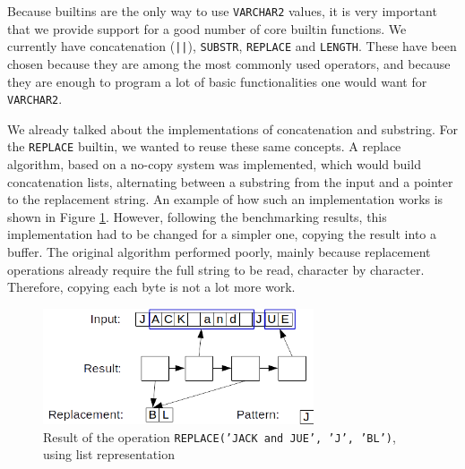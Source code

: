 \documentclass[twoside,11pt,a4paper]{article}
\newcommand{\pls}[1]{\small\texttt{#1}\normalsize}
\newcommand{\plstype}[1]{\pls{#1}}
\newcommand{\varchar}{\plstype{VARCHAR2}}
\begin{document}
Because builtins are the only way to use \varchar{} values, it is very important that we provide support for a good number of core builtin functions. We currently have concatenation (\pls{||}), \pls{SUBSTR}, \pls{REPLACE} and \pls{LENGTH}. These have been chosen because they are among the most commonly used operators, and because they are enough to program a lot of basic functionalities one would want for \varchar{}.

We already talked about the implementations of concatenation and substring. For the \pls{REPLACE} builtin, we wanted to reuse these same concepts. A replace algorithm, based on a no-copy system was implemented, which would build concatenation lists, alternating between a substring from the input and a pointer to the replacement string. An example of how such an implementation works is shown in Figure \ref{fig:replaceexample}. However, following the benchmarking results, this implementation had to be changed for a simpler one, copying the result into a buffer. The original algorithm performed poorly, mainly because replacement operations already require the full string to be read, character by character. Therefore, copying each byte is not a lot more work.


\begin{figure}[h]
	\centering
	\includegraphics[width=8cm]{./graphs/ReplacementExample.png}
	\caption{Result of the operation \pls{REPLACE('JACK and JUE', 'J', 'BL')}, using list representation}
	\label{fig:replaceexample}
\end{figure}
\end{document}
